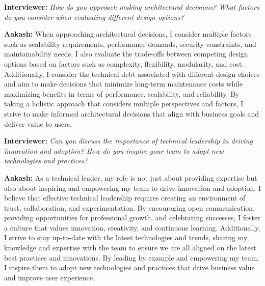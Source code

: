 \documentclass[12pt, a4paper]{article}
\newcommand{\interviewer}[1]{\noindent\textbf{Interviewer: }\textit{#1}\par\vspace{5pt}}
\newcommand{\candidate}[1]{\noindent\textbf{Aakash: }#1\par\vspace{15pt}}
\begin{document}
\interviewer{How do you approach making architectural decisions? What factors do you consider when evaluating different design options?}

\candidate{When approaching architectural decisions, I consider multiple factors such as scalability requirements, performance demands, security constraints, and maintainability needs. I also evaluate the trade-offs between competing design options based on factors such as complexity, flexibility, modularity, and cost. Additionally, I consider the technical debt associated with different design choices and aim to make decisions that minimize long-term maintenance costs while maximizing benefits in terms of performance, scalability, and reliability. By taking a holistic approach that considers multiple perspectives and factors, I strive to make informed architectural decisions that align with business goals and deliver value to users.}

\interviewer{Can you discuss the importance of technical leadership in driving innovation and adoption? How do you inspire your team to adopt new technologies and practices?}

\candidate{As a technical leader, my role is not just about providing expertise but also about inspiring and empowering my team to drive innovation and adoption. I believe that effective technical leadership requires creating an environment of trust, collaboration, and experimentation. By encouraging open communication, providing opportunities for professional growth, and celebrating successes, I foster a culture that values innovation, creativity, and continuous learning. Additionally, I strive to stay up-to-date with the latest technologies and trends, sharing my knowledge and expertise with the team to ensure we are all aligned on the latest best practices and innovations. By leading by example and empowering my team, I inspire them to adopt new technologies and practices that drive business value and improve user experience.}
\end{document}
